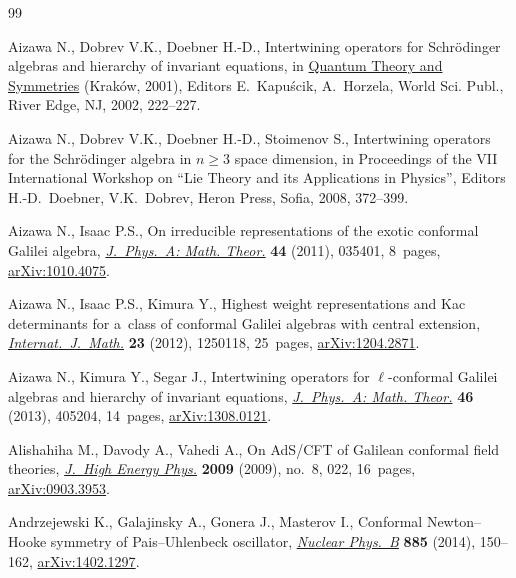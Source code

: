 \documentclass[pdftex]{sigma}
\numberwithin{equation}{section}
\begin{document}
\vspace{-3mm}

\begin{thebibliography}{99}
\footnotesize \itemsep=-1.27pt

\vspace{-1.5mm}

Aizawa N., Dobrev V.K., Doebner H.-D., Intertwining operators for {S}chr\"odinger algebras and hierarchy of invariant
equations, in \href{http://dx.doi.org/10.1142/9789812777850_0021}{Quantum Theory and Symmetries} ({K}rak\'ow, 2001),
Editors E.~Kapu\'scik, A.~Horzela, World Sci.
Publ., River Edge, NJ, 2002, 222--227.

Aizawa N., Dobrev V.K., Doebner H.-D., Stoimenov S., Intertwining operators for the Schr\"odinger algebra in $ n \geq 3
$ space dimension, in Proceedings of the VII International Workshop on ``Lie Theory and its Applications in Physics'',
Editors H.-D.~Doebner, V.K.~Dobrev, Heron Press, Sof\/ia, 2008, 372--399.

Aizawa N., Isaac P.S., On irreducible representations of the exotic conformal {G}alilei algebra,
\href{http://dx.doi.org/10.1088/1751-8113/44/3/035401}{\textit{J.~Phys.~A: Math. Theor.}} \textbf{44} (2011), 035401, 8~pages, \href{http://arxiv.org/abs/1010.4075}{arXiv:1010.4075}.

Aizawa N., Isaac P.S., Kimura Y., Highest weight representations and {K}ac determinants for a~class of conformal
{G}alilei algebras with central extension,
\href{http://dx.doi.org/10.1142/S0129167X12501182}{\textit{Internat.~J.~Math.}} \textbf{23} (2012), 1250118, 25~pages,
\href{http://arxiv.org/abs/1204.2871}{arXiv:1204.2871}.

Aizawa N., Kimura Y., Segar J., Intertwining operators for {$\ell$}-conformal {G}alilei algebras and hierarchy of
invariant equations, \href{http://dx.doi.org/10.1088/1751-8113/46/40/405204}{\textit{J.~Phys.~A: Math. Theor.}} \textbf{46} (2013), 405204, 14~pages, \href{http://arxiv.org/abs/1308.0121}{arXiv:1308.0121}.

Alishahiha M., Davody A., Vahedi A., On {A}d{S}/{CFT} of {G}alilean conformal f\/ield theories,
\href{http://dx.doi.org/10.1088/1126-6708/2009/08/022}{\textit{J.~High Energy Phys.}} \textbf{2009} (2009), no.~8, 022,
16~pages, \href{http://arxiv.org/abs/0903.3953}{arXiv:0903.3953}.

Andrzejewski K., Galajinsky A., Gonera J., Masterov I., Conformal {N}ewton--{H}ooke symmetry of {P}ais--{U}hlenbeck
oscillator, \href{http://dx.doi.org/10.1016/j.nuclphysb.2014.05.025}{\textit{Nuclear Phys.~B}} \textbf{885} (2014),
150--162, \href{http://arxiv.org/abs/1402.1297}{arXiv:1402.1297}.


\end{thebibliography}
\end{document}

